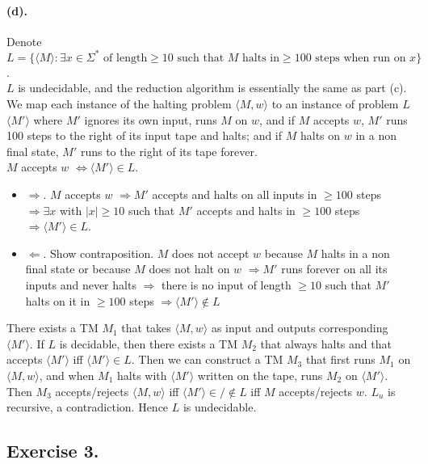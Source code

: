 \documentclass[12pt]{article}
\begin{document}
\paragraph*{(d).} Denote \(L = \{\langle M \rangle : \exists x \in \Sigma^* \text{ of length} \geq 10 \text{ such that } M \text{ halts in} \geq 100 \text{ steps when run on } x\}\).\\
\(L\) is undecidable, and the reduction algorithm is essentially the same as part (c). We map each instance of the halting problem \(\langle M, w\rangle\) to an instance of problem \(L\) \(\langle M' \rangle\) where \(M'\) ignores its own input, runs \(M\) on \(w\), and if \(M\) accepts \(w\), \(M'\) runs 100 steps to the right of its input tape and halts; and if \(M\) halts on \(w\) in a non final state, \(M'\) runs to the right of its tape forever.\\
\(M\) accepts \(w\) \(\Leftrightarrow \langle M'\rangle \in L\).
\begin{itemize}
  \item \(\Rightarrow\). \(M\) accepts \(w\) \(\Rightarrow M'\) accepts and halts on all inputs in \(\geq 100\) steps \(\Rightarrow \exists x\) with \(|x| \geq 10\) such that \(M'\) accepts and halts in \(\geq 100\) steps \(\Rightarrow \langle M' \rangle \in L\).
  \item \(\Leftarrow\). Show contraposition. \(M\) does not accept \(w\) because \(M\) halts in a non final state or because \(M\) does not halt on \(w\) \(\Rightarrow M'\) runs forever on all its inputs and never halts \(\Rightarrow\) there is no input of length \(\geq 10\) such that \(M'\) halts on it in \(\geq 100\) steps \(\Rightarrow \langle M' \rangle \notin L\)
\end{itemize}
There exists a TM \(M_1\) that takes \(\langle M, w\rangle\) as input and outputs corresponding \(\langle M' \rangle\). If \(L\) is decidable, then there exists a TM \(M_2\) that always halts and that accepts \(\langle M'\rangle\) iff \(\langle M'\rangle \in L\). Then we can construct a TM \(M_3\) that first runs \(M_1\) on \(\langle M, w\rangle\), and when \(M_1\) halts with \(\langle M' \rangle\) written on the tape, runs \(M_2\) on \(\langle M' \rangle\). Then \(M_3\) accepts/rejects \(\langle M, w\rangle\) iff \(\langle M' \rangle \in/\notin L\) iff \(M\) accepts/rejects \(w\). \(L_u\) is recursive, a contradiction. Hence \(L\) is undecidable.

\subsection*{Exercise 3.}
\end{document}
